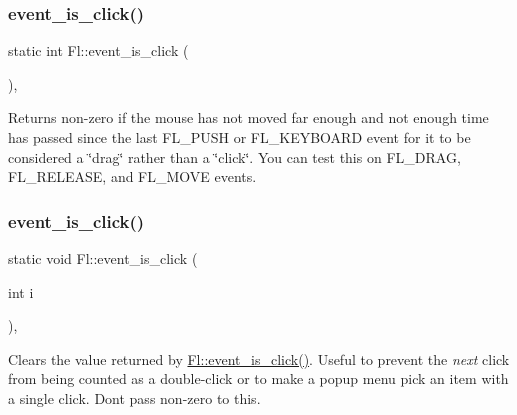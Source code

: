 \subsubsection{\texorpdfstring{event\+\_\+is\+\_\+click()}{event\_is\_click()}\hspace{0.1cm}{\footnotesize\ttfamily [1/2]}}
{\footnotesize\ttfamily static int Fl\+::event\+\_\+is\+\_\+click (\begin{DoxyParamCaption}{ }\end{DoxyParamCaption})\hspace{0.3cm}{\ttfamily [inline]}, {\ttfamily [static]}}

Returns non-\/zero if the mouse has not moved far enough and not enough time has passed since the last F\+L\+\_\+\+P\+U\+SH or F\+L\+\_\+\+K\+E\+Y\+B\+O\+A\+RD event for it to be considered a \char`\"{}drag\char`\"{} rather than a \char`\"{}click\char`\"{}. You can test this on F\+L\+\_\+\+D\+R\+AG, F\+L\+\_\+\+R\+E\+L\+E\+A\+SE, and F\+L\+\_\+\+M\+O\+VE events. \mbox{\label{group__fl__events_ga08ba811a19462788094768ed98798120}} 
\subsubsection{\texorpdfstring{event\+\_\+is\+\_\+click()}{event\_is\_click()}\hspace{0.1cm}{\footnotesize\ttfamily [2/2]}}
{\footnotesize\ttfamily static void Fl\+::event\+\_\+is\+\_\+click (\begin{DoxyParamCaption}\item[{int}]{i }\end{DoxyParamCaption})\hspace{0.3cm}{\ttfamily [inline]}, {\ttfamily [static]}}

Clears the value returned by \hyperlink{group__fl__events_gae4f3bafeb9fbae98c3b7cc6f5326e582}{Fl\+::event\+\_\+is\+\_\+click()}. Useful to prevent the {\itshape next} click from being counted as a double-\/click or to make a popup menu pick an item with a single click. Don\textquotesingle{}t pass non-\/zero to this. \mbox{\label{group__fl__events_ga1ac131e3cd5ca674cc022b1f77233449}} 
